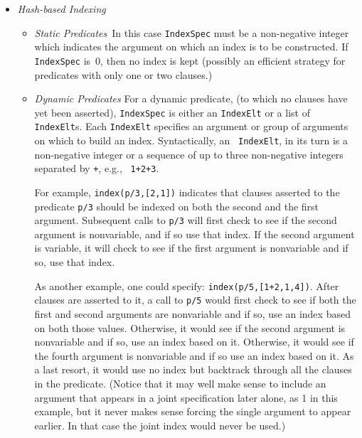 \begin{description}
\begin{itemize}
\item {\em Hash-based Indexing} 
\begin{itemize}
\item {\em Static Predicates}\ 
In this case {\tt IndexSpec} must be a non-negative integer which
indicates the argument on which an index is to be constructed.  If
{\tt IndexSpec} is~0, then no index is kept (possibly an efficient
strategy for predicates with only one or two clauses.)
\item {\em Dynamic Predicates}
For a dynamic predicate, (to which no clauses have yet been asserted),
{\tt IndexSpec} is either an {\tt IndexElt} or a list of {\tt
IndexElt}s.  Each {\tt IndexElt} specifies an argument or group of
arguments on which to build an index.  Syntactically, an {\tt
IndexElt}, in its turn is a non-negative integer or a sequence of up
to three non-negative integers separated by {\tt +}, e.g., {\tt
1+2+3}.

For example, {\tt index(p/3,[2,1])} indicates that clauses asserted to
the predicate {\tt p/3} should be indexed on both the second and the
first argument.  Subsequent calls to {\tt p/3} will first check to see
if the second argument is nonvariable, and if so use that index. If
the second argument is variable, it will check to see if the first
argument is nonvariable and if so, use that index.

As another example, one could specify: {\tt index(p/5,[1+2,1,4])}.
After clauses are asserted to it, a call to {\tt p/5} would first
check to see if both the first and second arguments are nonvariable
and if so, use an index based on both those values. Otherwise, it
would see if the second argument is nonvariable and if so, use an
index based on it. Otherwise, it would see if the fourth argument is
nonvariable and if so use an index based on it. As a last resort, it
would use no index but backtrack through all the clauses in the
predicate.  (Notice that it may well make sense to include an argument
that appears in a joint specification later alone, as 1 in this
example, but it never makes sense forcing the single argument to appear
earlier. In that case the joint index would never be used.)
\end{itemize}


\end{itemize}
\end{description}
